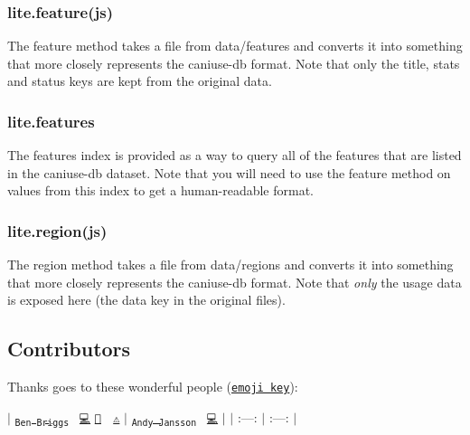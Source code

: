 \subsubsection*{{\ttfamily lite.\+feature(js)}}

The {\ttfamily feature} method takes a file from {\ttfamily data/features} and converts it into something that more closely represents the {\ttfamily caniuse-\/db} format. Note that only the {\ttfamily title}, {\ttfamily stats} and {\ttfamily status} keys are kept from the original data.

\subsubsection*{{\ttfamily lite.\+features}}

The {\ttfamily features} index is provided as a way to query all of the features that are listed in the {\ttfamily caniuse-\/db} dataset. Note that you will need to use the {\ttfamily feature} method on values from this index to get a human-\/readable format.

\subsubsection*{{\ttfamily lite.\+region(js)}}

The {\ttfamily region} method takes a file from {\ttfamily data/regions} and converts it into something that more closely represents the {\ttfamily caniuse-\/db} format. Note that {\itshape only} the usage data is exposed here (the {\ttfamily data} key in the original files).

\subsection*{Contributors}

Thanks goes to these wonderful people (\href{https://github.com/kentcdodds/all-contributors#emoji-key}{\tt emoji key})\+:

$\vert$ \href{http://beneb.info}{\tt \textsubscript{Ben Briggs}}~\newline
\href{https://github.com/ben-eb/caniuse-lite/commits?author=ben-eb}{\tt 💻} \href{https://github.com/ben-eb/caniuse-lite/commits?author=ben-eb}{\tt 📖} 👀 \href{https://github.com/ben-eb/caniuse-lite/commits?author=ben-eb}{\tt ⚠️} $\vert$ \href{https://github.com/andyjansson}{\tt \textsubscript{Andy Jansson}}~\newline
\href{https://github.com/ben-eb/caniuse-lite/commits?author=andyjansson}{\tt 💻} $\vert$ $\vert$ \+:---\+: $\vert$ \+:---\+: $\vert$


